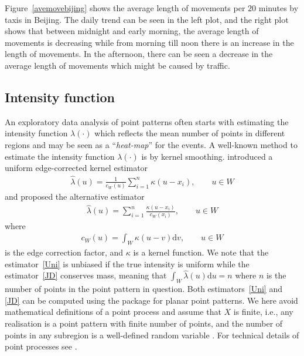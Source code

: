 \documentclass[article]{jss}
\newcommand{\de}{\mathrm{d}}
\begin{document}
Figure~\ref{avemovebijing} shows the average length of movements per $20$ minutes by taxis in Beijing. The daily trend can be seen in the left plot, and the right plot shows that between midnight and early morning, the average length of movements is decreasing while from morning till noon there is an increase in the length of movements. In the afternoon, there can be seen a decrease in the average length of movements which might be caused by traffic.

\subsection{Intensity function}\label{sec:intensity}
  An exploratory data analysis of point patterns often starts with estimating the intensity function $\lambda(\cdot)$ which reflects the mean number of points in different regions and may be seen as a ``\textit{heat-map}'' for the events. A well-known method to estimate the intensity function $\lambda(\cdot)$ is by kernel smoothing. \cite{D85} introduced a uniform edge-corrected kernel estimator
  \begin{eqnarray}\label{Uni}
  \widehat{\lambda}(u)=\frac{1}{c_W(u)}\sum\limits_{i=1}^{n} \kappa(u-x_i), \qquad u \in W
  \end{eqnarray}
  and \cite{jones93} proposed the alternative estimator
  \begin{eqnarray}\label{JD}
  \widehat{\lambda}(u)=\sum\limits_{i=1}^{n} \frac{\kappa(u-x_i)}{c_W(x_i)}, \qquad u \in W 
  \end{eqnarray}
  where
  \begin{eqnarray}
  c_W(u)=\int_W \kappa(u-v) \de v, \qquad u \in W
  \end{eqnarray}
  is the edge correction factor, and $\kappa$ is a kernel function. We note that the estimator~\ref{Uni} is unbiased if the true intensity is uniform while the estimator~\ref{JD} conserves mass, meaning that $\int_W \widehat{\lambda}(u) \de u =n$ where $n$ is the number of points in the point pattern in question. Both estimators~\ref{Uni} and \ref{JD} can be computed using the  package  for planar point patterns. We here avoid mathematical definitions of a point process and assume that $X$ is finite, i.e., any realisation is a point pattern with finite number of points, and the number of points in any subregion is a well-defined random variable \citep{BRT15}. For technical details of point processes see \citet{MW03,daley07}.
  
\end{document}
